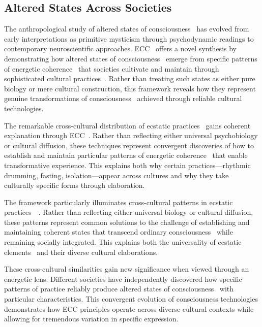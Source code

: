 \subsection*{Altered States Across Societies}

The anthropological study of altered states of consciousness~ has evolved from early interpretations as primitive mysticism through psychodynamic readings to contemporary neuroscientific approaches. ECC~ offers a novel synthesis by demonstrating how altered states of consciousness~ emerge from specific patterns of energetic coherence~ that societies cultivate and maintain through sophisticated cultural practices~\cite{bourguignon1976possession,bourguignon1973religion}. Rather than treating such states as either pure biology or mere cultural construction, this framework reveals how they represent genuine transformations of consciousness~ achieved through reliable cultural technologies.

The remarkable cross-cultural distribution of ecstatic practices~ gains coherent explanation through ECC~\cite{eliade1964shamanism,eliade1959sacred}. Rather than reflecting either universal psychobiology or cultural diffusion, these techniques represent convergent discoveries of how to establish and maintain particular patterns of energetic coherence~ that enable transformative experience. This explains both why certain practices—rhythmic drumming, fasting, isolation—appear across cultures and why they take culturally specific forms through elaboration.

The framework particularly illuminates cross-cultural patterns in ecstatic practices~~\cite{goodman1988ecstasy,xygalatas2013burning}. Rather than reflecting either universal biology or cultural diffusion, these patterns represent common solutions to the challenge of establishing and maintaining coherent states that transcend ordinary consciousness~ while remaining socially integrated. This explains both the universality of ecstatic elements~ and their diverse cultural elaborations.

These cross-cultural similarities gain new significance when viewed through an energetic lens. Different societies have independently discovered how specific patterns of practice reliably produce altered states of consciousness~ with particular characteristics. This convergent evolution of consciousness technologies demonstrates how ECC principles operate across diverse cultural contexts while allowing for tremendous variation in specific expression.

